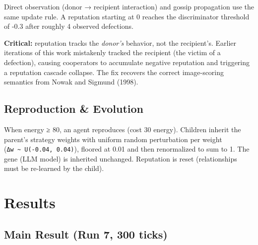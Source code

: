 \documentclass[
  11pt,
  letterpaper,
]{article}
\begin{document}
Direct observation (donor → recipient interaction) and gossip
propagation use the same update rule. A reputation starting at 0 reaches
the discriminator threshold of -0.3 after roughly 4 observed defections.

\textbf{Critical:} reputation tracks the \emph{donor's} behavior, not
the recipient's. Earlier iterations of this work mistakenly tracked the
recipient (the victim of a defection), causing cooperators to accumulate
negative reputation and triggering a reputation cascade collapse. The
fix recovers the correct image-scoring semantics from Nowak and Sigmund
(1998).

\subsection{Reproduction \& Evolution}\label{reproduction-evolution}

When energy ≥ 80, an agent reproduces (cost 30 energy). Children inherit
the parent's strategy weights with uniform random perturbation per
weight (\texttt{Δw\ \textasciitilde{}\ U(-0.04,\ 0.04)}), floored at
0.01 and then renormalized to sum to 1. The gene (LLM model) is
inherited unchanged. Reputation is reset (relationships must be
re-learned by the child).

\section{Results}\label{results}

\subsection{Main Result (Run 7, 300
ticks)}\label{main-result-run-7-300-ticks}
\end{document}
